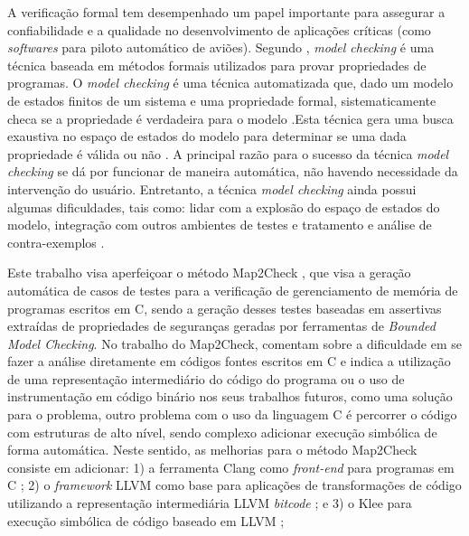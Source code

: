 \par
A verificação formal tem desempenhado um papel importante para
assegurar a confiabilidade e a qualidade no desenvolvimento de
aplicações críticas (como \textit{softwares} para piloto automático de aviões). 
Segundo , \textit{model
checking} é uma técnica baseada em métodos formais utilizados para provar propriedades de programas. O \textit{model checking} é uma técnica automatizada que, dado um modelo de estados finitos de um sistema e uma propriedade formal, sistematicamente checa se a propriedade é verdadeira para o modelo \cite{Baier:2008}.Esta técnica gera uma busca exaustiva no espaço de estados do modelo para
determinar se uma dada propriedade é válida ou não \cite{Baier:2008}. A principal razão para o sucesso da técnica \textit{model checking} se dá por funcionar de maneira automática, não havendo necessidade da intervenção do usuário. Entretanto, a técnica \textit{model checking} ainda possui algumas dificuldades, tais como: lidar com a explosão do espaço de estados do modelo, integração com outros ambientes de testes e tratamento e análise de contra-exemplos \cite{Clark:2008}.

\par
Este trabalho visa aperfeiçoar o método Map2Check \cite{Rocha:2015}, que visa a geração automática de casos de testes para a verificação de gerenciamento de memória de programas escritos em C, sendo a geração desses testes baseadas em
assertivas extraídas de propriedades de seguranças geradas por ferramentas de
\textit{Bounded Model Checking}. No trabalho do Map2Check, 
comentam sobre a dificuldade em se fazer a análise diretamente em códigos fontes escritos em C
e indica a utilização de uma representação intermediário do código do programa ou o uso de instrumentação em código binário nos seus trabalhos futuros, como uma solução para o problema, outro problema com o uso da linguagem C é percorrer o código com estruturas de alto nível, sendo complexo adicionar execução simbólica de forma automática. Neste sentido, as melhorias para o método Map2Check consiste em adicionar: 
1) a ferramenta Clang como \textit{front-end} para programas em C \cite{LLVM:2017}; 
2) o \textit{framework} LLVM como base para aplicações de transformações de código utilizando a representação intermediária LLVM \textit{bitcode} \cite{LLVM:2017}; e
3) o Klee para execução simbólica de código baseado em LLVM \cite{Cadar:2008:KUA}; 

